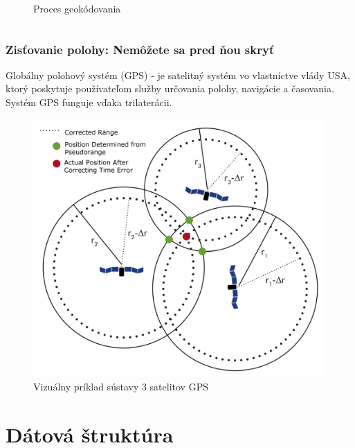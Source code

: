\documentclass{beamer}
\begin{document}
\begin{frame}[fragile=singleslide]
\begin{columns}
\begin{column}{0.5\textwidth}
\begin{figure}[h]
		\caption{Proces geokódovania}
		\label{fig:geocoding}
	\end{figure}
	\end{column}
\end{columns}
\end{frame}

\begin{frame}[fragile=singleslide]\frametitle{Zisťovanie polohy: Nemôžete sa pred ňou skryť}
Globálny polohový systém (GPS) - je satelitný systém vo vlastníctve vlády USA, ktorý poskytuje používateľom služby určovania polohy, navigácie a časovania. Systém GPS funguje vďaka trilaterácii.
\begin{figure}[h]
	\centering
	\includegraphics[scale=0.05]{diagram3.png}
	\caption{Vizuálny príklad sústavy 3 satelitov GPS}
	\label{fig:trilateration}
\end{figure}
\end{frame}

\section{Dátová štruktúra}
\end{document}

